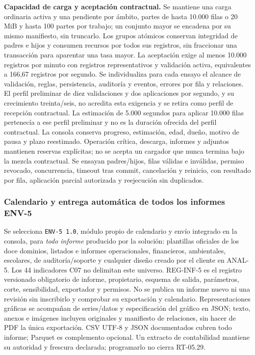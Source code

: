 \textbf{Capacidad de carga y aceptación contractual.}
Se mantiene una carga ordinaria activa y una pendiente por ámbito, partes de hasta 10.000 filas o 20 MiB y hasta 100 partes por trabajo; un conjunto mayor se encadena por su mismo manifiesto, sin truncarlo. Los grupos atómicos conservan integridad de padres e hijos y consumen recursos por todos sus registros, sin fraccionar una transacción para aparentar una tasa mayor.
La aceptación exige al menos 10.000 registros por minuto con registros representativos y validación activa, equivalentes a 166,67 registros por segundo. Se individualiza para cada ensayo el alcance de validación, reglas, persistencia, auditoría y eventos, errores por fila y relaciones. El perfil preliminar de diez validaciones y dos aplicaciones por segundo, y su crecimiento treinta/seis, no acredita esta exigencia y se retira como perfil de recepción contractual. La estimación de 5.000 segundos para aplicar 10.000 filas pertenecía a ese perfil preliminar y no es la duración ofrecida del perfil contractual.
La consola conserva progreso, estimación, edad, dueño, motivo de pausa y plazo reestimado. Operación crítica, descarga, informes y adjuntos mantienen reservas explícitas; no se acepta un cargador que nunca termina bajo la mezcla contractual. Se ensayan padres/hijos, filas válidas e inválidas, permiso revocado, concurrencia, timeout tras commit, cancelación y reinicio, con resultado por fila, aplicación parcial autorizada y reejecución sin duplicados.

\subsubsection{Calendario y entrega automática de todos los informes ENV-5}
\label{subsec:sd5_env5}

Se selecciona \texttt{ENV-5 1.0}, módulo propio de calendario y envío integrado en la consola, para \emph{todo informe} producido por la solución: plantillas oficiales de los doce dominios, listados e informes operacionales, financieros, ambientales, escolares, de auditoría/soporte y cualquier diseño creado por el cliente en ANAL-5. Los 44 indicadores C07 no delimitan este universo. REG-INF-5 es el registro versionado obligatorio de informe, propietario, esquema de salida, parámetros, corte, sensibilidad, exportador y permisos. No se publica un informe nuevo ni una revisión sin inscribirlo y comprobar su exportación y calendario. Representaciones gráficas se acompañan de series/datos y especificación del gráfico en JSON; texto, anexos e imágenes incluyen originales y manifiesto de relaciones, sin hacer de PDF la única exportación. CSV UTF-8 y JSON documentados cubren todo informe; Parquet es complemento opcional. Un extracto de contabilidad mantiene su autoridad y frescura declarada; programarlo no cierra RT-05.29.

